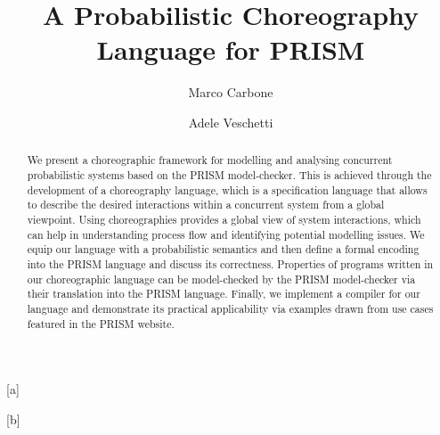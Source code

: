 \documentclass{lmcs} %
\theoremstyle{plain}\newtheorem{satz}[thm]{Satz} %
\def\eg{{\em e.g.}}
\begin{document}
\title[A Probabilistic Choreography Language for PRISM]
{A Probabilistic Choreography Language for PRISM}

\author[M.~Carbone]{Marco Carbone}[a]
\author[A.~Veschetti]{Adele Veschetti}[b]

\address{Computer Science Department, IT University of Copenhagen, Rued Langgaards Vej 7, 2300 Copenhagen S, Denmark}	%

\address{Department of Computer Science, TU Darmstadt, Hochschulstraße 10, 64289 Darmstadt, Germany} %

\begin{abstract}
  \noindent We present a choreographic framework for modelling and
  analysing concurrent probabilistic systems based on the PRISM
  model-checker. This is achieved through the development of a
  choreography language, which is a specification language that allows
  to describe the desired interactions within a concurrent system from
  a global viewpoint. Using choreographies provides a global view of
  system interactions, which can help in understanding process flow
  and identifying potential modelling issues.  We equip our language
  with a probabilistic semantics and then define a formal encoding
  into the PRISM language and discuss its correctness. Properties of
  programs written in our choreographic language can be model-checked
  by the PRISM model-checker via their translation into the PRISM
  language.  Finally, we implement a compiler for our language and
  demonstrate its practical applicability via examples drawn from use
  cases featured in the PRISM website.
\end{abstract}
\end{document}

